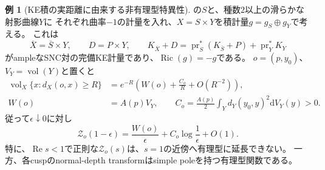 \documentclass[11pt,a4paper]{ltjsarticle}
\newcommand{\dd}{\mathrm d}
\newcommand{\Ric}{\operatorname{Ric}}
\newcommand{\vol}{\operatorname{vol}}
\newcommand{\ov}{\overline}
\theoremstyle{plain}
\theoremstyle{definition}
\newtheorem{example}[example]{例}
\theoremstyle{remark}
\begin{document}
\begin{example}[KE積の実距離に由来する非有理型特異性]
\label{ex:KE-product-distance-log}
の$S$と、種数$2$以上の滑らかな射影曲線$Y$に
それぞれ曲率$-1$の計量を入れ、$X=S\times Y$を積計量$g=g_S\oplus g_Y$で考える。
これは
\[
 \ov X=\ov S\times Y,\qquad D=P\times Y,\qquad
 K_{\ov X}+D=\operatorname{pr}_S^*(K_{\ov S}+P)
                      +\operatorname{pr}_Y^*K_Y
\]
がampleなSNC対の完備KE計量であり、$\Ric(g)=-g$である。
$o=(p,y_0)$、$V_Y=\vol(Y)$と置くと
\begin{align}
 \vol_X\{x:d_X(o,x)\ge R\}
 &=e^{-R}\left(W(o)+\frac{C_o}{R}+O(R^{-2})\right),
 \label{eq:KE-product-tail-second-order}\\
 W(o)&=A(p)V_Y,\qquad
 C_o=\frac{A(p)}2\int_Y d_Y(y_0,y)^2\dd V_Y(y)>0.
 \label{eq:KE-product-log-coefficient}
\end{align}
従って$\epsilon\downarrow0$に対し
\begin{equation}
\label{eq:KE-product-distance-log}
 \mathcal Z_o(1-\epsilon)
 =\frac{W(o)}{\epsilon}+C_o\log\frac1\epsilon+O(1).
\end{equation}
特に、$\operatorname{Re}s<1$で正則な$\mathcal Z_o(s)$は、$s=1$の近傍へ有理型に延長できない。
一方、各cuspのnormal-depth transformはsimple poleを持つ有理型関数である。
\end{example}
\end{document}
